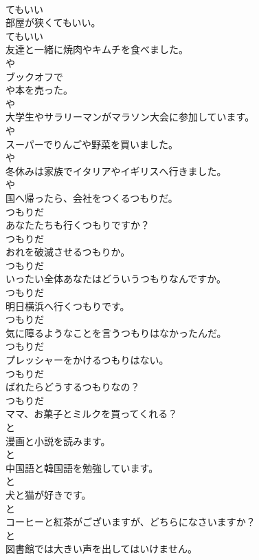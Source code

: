 \documentclass[8pt]{extreport}
\begin{document}
\begin{CJK}{UTF8}{min}
\\	てもいい
\\	部屋が狭くてもいい。	
\\	てもいい
\\	友達と一緒に焼肉やキムチを食べました。	
\\	や
\\	ブックオフで
\\	や本を売った。	
\\	や
\\	大学生やサラリーマンがマラソン大会に参加しています。	
\\	や
\\	スーパーでりんごや野菜を買いました。	
\\	や
\\	冬休みは家族でイタリアやイギリスへ行きました。	
\\	や
\\	国へ帰ったら、会社をつくるつもりだ。	
\\	つもりだ
\\	あなたたちも行くつもりですか？	
\\	つもりだ
\\	おれを破滅させるつもりか。	
\\	つもりだ
\\	いったい全体あなたはどういうつもりなんですか。	
\\	つもりだ
\\	明日横浜へ行くつもりです。	
\\	つもりだ
\\	気に障るようなことを言うつもりはなかったんだ。	
\\	つもりだ
\\	プレッシャーをかけるつもりはない。	
\\	つもりだ
\\	ばれたらどうするつもりなの？	
\\	つもりだ
\\	ママ、お菓子とミルクを買ってくれる？	
\\	と
\\	漫画と小説を読みます。	
\\	と
\\	中国語と韓国語を勉強しています。	
\\	と
\\	犬と猫が好きです。	
\\	と
\\	コーヒーと紅茶がございますが、どちらになさいますか？	
\\	と
\\	図書館では大きい声を出してはいけません。	

\end{CJK}
\end{document}
